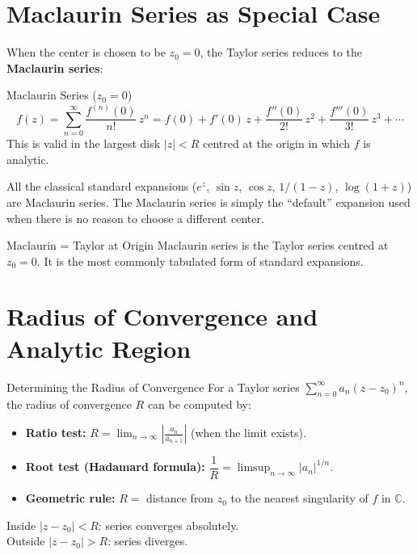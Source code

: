 \documentclass[12pt,a4paper]{article}
\begin{document}
\section{Maclaurin Series as Special Case}

When the center is chosen to be $z_0 = 0$, the Taylor series reduces to the \textbf{Maclaurin series}:

\begin{infobox}{Maclaurin Series ($z_0 = 0$)}
\[
  f(z) = \sum_{n=0}^{\infty} \frac{f^{(n)}(0)}{n!}\,z^n
       = f(0) + f'(0)\,z + \frac{f''(0)}{2!}\,z^2 + \frac{f'''(0)}{3!}\,z^3 + \cdots
\]
This is valid in the largest disk $|z| < R$ centred at the origin in which $f$ is analytic.
\end{infobox}

All the classical standard expansions ($e^z$, $\sin z$, $\cos z$, $1/(1-z)$, $\log(1+z)$) are Maclaurin series. The Maclaurin series is simply the ``default'' expansion used when there is no reason to choose a different center.

\begin{learnbox}{Maclaurin = Taylor at Origin}
Maclaurin series is the Taylor series centred at $z_0 = 0$. It is the most commonly tabulated form of standard expansions.
\end{learnbox}

\section{Radius of Convergence and Analytic Region}

\begin{infobox}{Determining the Radius of Convergence}
For a Taylor series $\displaystyle\sum_{n=0}^{\infty} a_n (z-z_0)^n$, the radius of convergence $R$ can be computed by:
\begin{itemize}[noitemsep]
  \item \textbf{Ratio test:} $R = \displaystyle\lim_{n\to\infty}\left|\frac{a_n}{a_{n+1}}\right|$ (when the limit exists).
  \item \textbf{Root test (Hadamard formula):} $\dfrac{1}{R} = \displaystyle\limsup_{n\to\infty} |a_n|^{1/n}$.
  \item \textbf{Geometric rule:} $R = $ distance from $z_0$ to the nearest singularity of $f$ in $\mathbb{C}$.
\end{itemize}
Inside $|z - z_0| < R$: series converges absolutely.\\
Outside $|z - z_0| > R$: series diverges.
\end{infobox}
\end{document}
